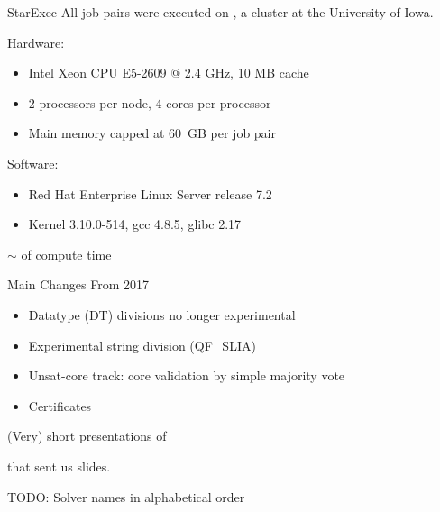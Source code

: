 \documentclass{beamer}
\begin{document}

\begin{frame}{StarExec}
  All job pairs were executed on , a cluster at
  the University of Iowa.

  \bigskip

  \qquad\begin{minipage}{\dimexpr\textwidth-3cm}
              {\footnotesize
  Hardware:
  \begin{itemize}
  \item Intel Xeon CPU E5-2609 @ 2.4 GHz, 10 MB cache
  \item 2 processors per node, 4 cores per processor
  \item Main memory capped at 60~GB per job pair
  \end{itemize}

  \medskip

  Software:
  \begin{itemize}
  \item Red Hat Enterprise Linux Server release 7.2
  \item Kernel 3.10.0-514, gcc 4.8.5, glibc 2.17
  \end{itemize}
              }
  \end{minipage}

  \bigskip
  \bigskip

  $\sim$  of compute time
\end{frame}


\begin{frame}{Main Changes From 2017}
  \begin{itemize}
  \item Datatype (DT) divisions no longer experimental
    \bigskip
  \item Experimental string division (QF\_SLIA)
    \bigskip
  \item Unsat-core track: core validation by simple majority vote
    \bigskip
  \item Certificates
  \end{itemize}
\end{frame}


\begin{frame}{}
(Very) short presentations of

  \begin{center}
    \vfill

    {\huge {}}

    \vfill
  \end{center}

  that sent us slides.

  \vfill

  \begin{center}
    TODO: Solver names in alphabetical order
  \end{center}
\end{frame}
\end{document}
